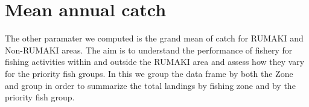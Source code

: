 \documentclass[
  12pt,
  a4paper,
  oneside]{book}
\newenvironment{Shaded}{\begin{snugshade}}{\end{snugshade}}
\newcommand{\DataTypeTok}[1]{\textcolor[rgb]{0.13,0.29,0.53}{#1}}
\newcommand{\KeywordTok}[1]{\textcolor[rgb]{0.13,0.29,0.53}{\textbf{#1}}}
\newcommand{\NormalTok}[1]{#1}
\newcommand{\OperatorTok}[1]{\textcolor[rgb]{0.81,0.36,0.00}{\textbf{#1}}}
\newcommand{\OtherTok}[1]{\textcolor[rgb]{0.56,0.35,0.01}{#1}}
\newcommand{\StringTok}[1]{\textcolor[rgb]{0.31,0.60,0.02}{#1}}
\begin{document}
\hypertarget{mean-annual-catch}{%
\section{Mean annual catch}\label{mean-annual-catch}}

The other paramater we computed is the grand mean of catch for RUMAKI and Non-RUMAKI areas. The aim is to understand the performance of fishery for fishing activities within and outside the RUMAKI area and assess how they vary for the priority fish groups. In this we group the data frame by both the Zone and group in order to summarize the total landings by fishing zone and by the priority fish group.

\begin{Shaded}
\end{Shaded}
\end{document}
